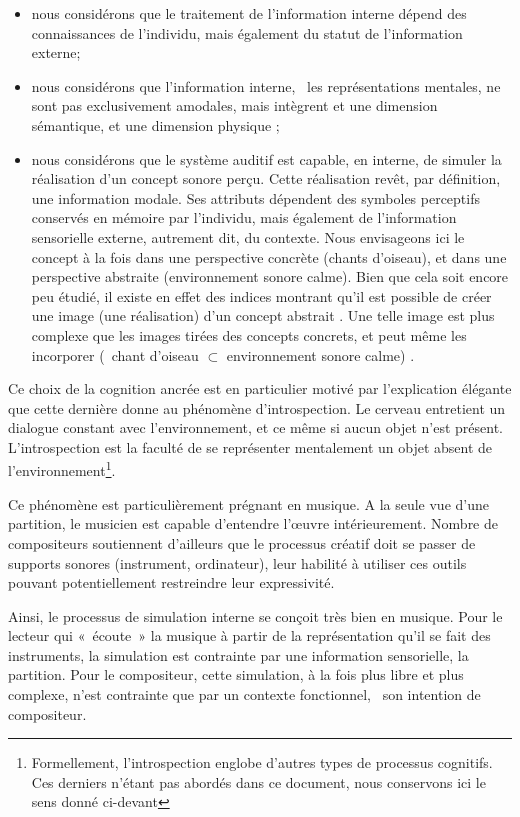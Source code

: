 \begin{itemize}
\item nous considérons que le traitement de l'information interne dépend des connaissances de l'individu, mais également du statut de l'information externe;
\item nous considérons que l'information interne, \ie~les représentations mentales, ne sont pas exclusivement amodales, mais intègrent et une dimension sémantique, et une dimension physique \citep{barsalou2008grounded};
\item nous considérons que le système auditif est capable, en interne, de simuler la réalisation d'un concept sonore perçu. Cette réalisation revêt, par définition, une information modale. Ses attributs dépendent des symboles perceptifs conservés en mémoire par l'individu, mais également de l'information sensorielle externe, autrement dit, du contexte. Nous envisageons ici le concept à la fois dans une perspective concrète (chants d'oiseau), et dans une perspective abstraite (environnement sonore calme). Bien que cela soit encore peu étudié, il existe en effet des indices montrant qu'il est possible de créer une image (une réalisation) d'un concept abstrait \citep{barsalou2003abstraction,barsalou2005situating}. Une telle image est plus complexe que les images tirées des concepts concrets, et peut même les incorporer (\eg~chant d'oiseau $\subset$ environnement sonore calme) \citep{barsalou2005situating}.
\end{itemize}
 
Ce choix de la cognition ancrée est en particulier motivé par l'explication élégante que cette dernière donne au phénomène d'introspection. Le cerveau entretient un dialogue constant avec l'environnement, et ce même si aucun objet n'est présent. L'introspection est la faculté de se représenter mentalement un objet absent de l'environnement\footnote{Formellement, l'introspection englobe d'autres types de processus cognitifs. Ces derniers n'étant pas abordés dans ce document, nous conservons ici le sens donné ci-devant}.

Ce phénomène est particulièrement prégnant en musique. A la seule vue d'une partition, le musicien est capable d'entendre l'œuvre intérieurement. Nombre de compositeurs soutiennent d'ailleurs que le processus créatif doit se passer de supports sonores (instrument, ordinateur), leur habilité à utiliser ces outils pouvant potentiellement restreindre leur expressivité.

Ainsi, le processus de simulation interne se conçoit très bien en musique. Pour le lecteur qui «~écoute~» la musique à partir de la représentation qu'il se fait des instruments, la simulation est contrainte par une information sensorielle, la partition. Pour le compositeur, cette simulation, à la fois plus libre et plus complexe, n'est contrainte que par un contexte fonctionnel, \ie~son intention de compositeur.

